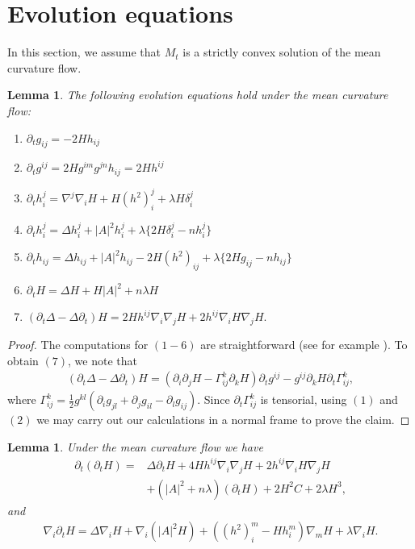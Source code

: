 \documentclass{amsart}
\newtheorem{lemma}[theorem]{Lemma}
\theoremstyle{definition}
\theoremstyle{remark}
\numberwithin{equation}{section}
\begin{document}
\section{Evolution equations}
In this section, we assume that $M_t$ is a strictly convex solution of the mean curvature flow.
\begin{lemma}\label{lem: lem3}
The following evolution equations hold under the mean curvature flow:
\begin{enumerate}
  \item $\partial_tg_{ij}=-2Hh_{ij}$
  \item $\partial_tg^{ij}=2Hg^{im}g^{jn}h_{ij}=2Hh^{ij}$
  \item $\partial_t h_i^j=\nabla^j\nabla_iH+H(h^2)_i^j+\lambda H\delta_i^j$
  \item $\partial_t h_i^j=\Delta h_i^j+|A|^2h_i^j+\lambda \{2H\delta_i^j-nh_i^j\}$
  \item $\partial_t h_{ij}=\Delta h_{ij}+|A|^2h_{ij}-2H(h^2)_{ij}+\lambda \{2Hg_{ij}-nh_{ij}\}$
  \item $\partial_t H=\Delta H+H|A|^2+n\lambda H$
  \item $(\partial_t\Delta-\Delta\partial_t)H=2Hh^{ij}\nabla_i\nabla_jH+2h^{ij}\nabla_iH\nabla_jH.$
\end{enumerate}
\end{lemma}
\begin{proof} The computations for $(1-6)$ are straightforward (see for example \cite{Huisken 87}). To obtain $(7)$, we note that
\begin{align*}
(\partial_t\Delta-\Delta\partial_t)H=\left(\partial_i\partial_jH-\Gamma_{ij}^k\partial_kH\right)\partial_tg^{ij}-g^{ij}\partial_kH\partial_t\Gamma_{ij}^k,
\end{align*}
where $\Gamma_{ij}^k=\frac{1}{2}g^{kl}(\partial_ig_{jl}+\partial_jg_{il}-\partial_lg_{ij}).$ Since $\partial_t\Gamma_{ij}^k$ is tensorial, using $(1)$ and $ (2)$ we may carry out our calculations in a normal frame to prove the claim.
\end{proof}
\begin{lemma}\label{lem: lem1}
Under the mean curvature flow we have
\begin{align*}
\partial_t(\partial_tH)=&
\Delta \partial_tH+4Hh^{ij}\nabla_i\nabla_jH+2h^{ij}\nabla_iH\nabla_jH\\
&+(|A|^2+n\lambda )(\partial_t H)+2H^2C+2\lambda H^3,
\end{align*}
and
\begin{align*}
\nabla_i\partial_tH
=\Delta\nabla_iH+\nabla_i(|A|^2H)+((h^2)_i^m-Hh_i^m)\nabla_mH+\lambda \nabla_iH.
\end{align*}
\end{lemma}
\end{document}
